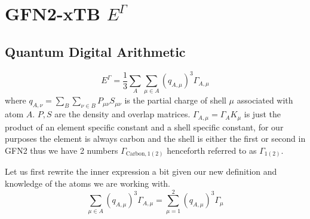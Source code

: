 \documentclass{article}
\begin{document}
\section{GFN2-xTB $E^\Gamma$}
\subsection{Quantum Digital Arithmetic}
\begin{equation}
    E^\Gamma = \frac{1}{3}\sum_A\sum_{\mu\in A} (q_{A,\mu})^3\Gamma_{A,\mu}
\end{equation}
where $q_{A,\nu}=\sum_B\sum_{\nu\in B}P_{\mu\nu}S_{\mu\nu}$ is the partial charge of shell $\mu$ associated with atom $A$. $P, S$ are the density and overlap matrices. $\Gamma_{A,\mu} = \Gamma_A K_\mu$ is just the product of an element specific constant and a shell specific constant, for our purposes the element is always carbon and the shell is either the first or second in GFN2 thus we have 2 numbers $\Gamma_{\text{Carbon},1(2)}$ henceforth referred to as $\varGamma_{1(2)}$. 

\vspace{\baselineskip}
\noindent
Let us first rewrite the inner expression a bit given our new definition and knowledge of the atoms we are working with. 
\begin{equation}
    \sum_{\mu\in A} (q_{A,\mu})^3\Gamma_{A,\mu} = \sum_{\mu = 1}^2 (q_{A,\mu})^3\varGamma_{\mu}
\end{equation}
\end{document}

